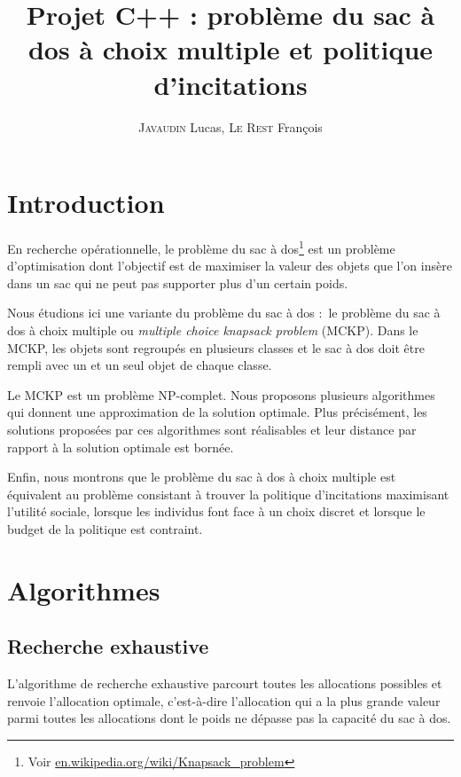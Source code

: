 \documentclass{article}
\title{Projet C++ : problème du sac à dos à choix multiple et politique d'incitations}
\author{\textsc{Javaudin} Lucas, \textsc{Le Rest} François}
\begin{document}
\maketitle

\tableofcontents

\newpage

\section{Introduction}

En recherche opérationnelle, le problème du sac à dos\footnote{Voir \url{en.wikipedia.org/wiki/Knapsack_problem}} est un problème d'optimisation dont l'objectif est de maximiser la valeur des objets que l'on insère dans un sac qui ne peut pas supporter plus d'un certain poids.

Nous étudions ici une variante du problème du sac à dos : le problème du sac à dos à choix multiple ou \textit{multiple choice knapsack problem} (MCKP).
Dans le MCKP, les objets sont regroupés en plusieurs classes et le sac à dos doit être rempli avec un et un seul objet de chaque classe.

Le MCKP est un problème NP-complet.
Nous proposons plusieurs algorithmes qui donnent une approximation de la solution optimale.
Plus précisément, les solutions proposées par ces algorithmes sont réalisables et leur distance par rapport à la solution optimale est bornée.

Enfin, nous montrons que le problème du sac à dos à choix multiple est équivalent au problème consistant à trouver la politique d'incitations maximisant l'utilité sociale, lorsque les individus font face à un choix discret et lorsque le budget de la politique est contraint.

\section{Algorithmes}

\subsection{Recherche exhaustive}

L'algorithme de recherche exhaustive parcourt toutes les allocations possibles et renvoie l'allocation optimale, c'est-à-dire l'allocation qui a la plus grande valeur parmi toutes les allocations dont le poids ne dépasse pas la capacité du sac à dos.
\end{document}
